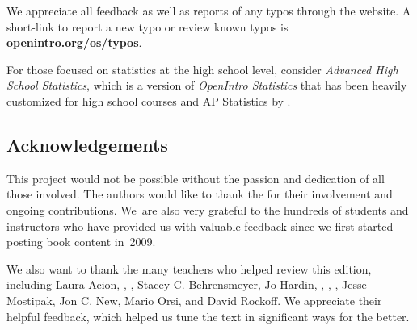 \noindent%
We appreciate all feedback as well as reports of any
typos through the website.
A short-link to report a new typo or review known typos is
    {\color{black}\textbf{openintro.org/os/typos}}. \vspace{3mm}

\noindent%
For those focused on statistics at the high school level,
consider
    {\emph{Advanced High School Statistics}},
which is a version of \emph{OpenIntro Statistics} that has
been heavily customized for high school courses and
AP\textsuperscript{\textregistered} Statistics
by .


\subsection*{Acknowledgements}
This project would not be possible without the passion
and dedication of all those involved.
The authors would like to thank the
for their involvement and ongoing contributions.
We~are also very grateful to the hundreds of students
and instructors who have provided us with valuable feedback
since we first started posting book content in~2009. \vspace{3mm}

\noindent%
We also want to thank the many teachers who helped review
this edition, including
Laura Acion,
,
,
Stacey C. Behrensmeyer,
Jo Hardin,
,
,
,
Jesse Mostipak,
Jon C. New,
Mario Orsi,
and David Rockoff.
We appreciate their helpful feedback, which helped us tune
the text in significant ways for the better.
